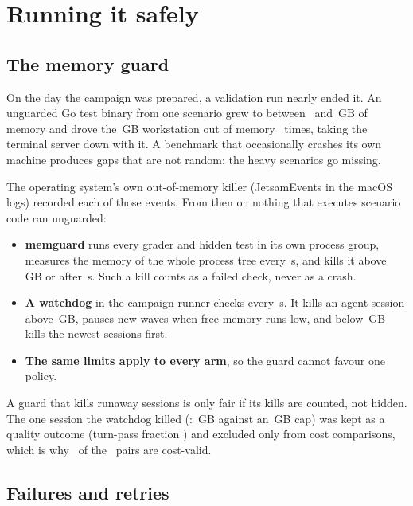 \section{Running it safely}\label{sec:running}

\subsection{The memory guard}

On the day the campaign was prepared, a validation run nearly ended it. An unguarded Go test binary from
one scenario grew to between \MemGrowLow\ and \MemGrowHigh\,GB of memory and drove the
\MemMacGB\,GB workstation out of memory \MemTimes\ times, taking the terminal server down with it. A
benchmark that occasionally crashes its own machine produces gaps that are not random: the heavy scenarios
go missing.

The operating system's own out-of-memory killer (JetsamEvents in the macOS logs) recorded each of those events. From then on nothing that executes scenario code ran unguarded:
\begin{itemize}
  \item \textbf{memguard} runs every grader and hidden test in its own process group, measures the memory
    of the whole process tree every \MemPollS\,s, and kills it above \MemGraderGB\,GB or after
    \MemGraderS\,s. Such a kill counts as a failed check, never as a crash.
  \item \textbf{A watchdog} in the campaign runner checks every \MemWatchS\,s. It kills an agent session
    above \KillCap\,GB, pauses new waves when free memory runs low, and below \MemHardFloorGB\,GB kills the
    newest sessions first.
  \item \textbf{The same limits apply to every arm}, so the guard cannot favour one policy.
\end{itemize}

\begin{keyidea}
A guard that kills runaway sessions is only fair if its kills are counted, not hidden. The one session the
watchdog killed (\KillSession: \KillRSS\,GB against an \KillCap\,GB cap) was kept as a quality outcome
(turn-pass fraction \KillTurnPass) and excluded only from cost comparisons, which is why
\NPairsValid\ of the \NPairs\ pairs are cost-valid.
\end{keyidea}

\subsection{Failures and retries}

